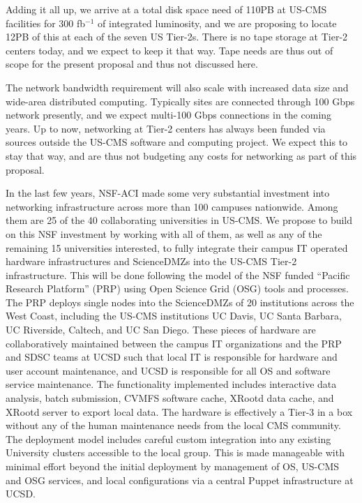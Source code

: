 \documentclass[11pt,a4paper]{article}
\begin{document}
Adding it all up, we arrive at a total disk space need of 110PB at US-CMS facilities for 300 fb$^{-1}$ of integrated luminosity, 
and we are proposing to locate 12PB of this at each of the seven US Tier-2s.
There is no tape storage at Tier-2 centers today, and we expect to keep it that way. Tape needs are thus out of scope for the present proposal
and thus not discussed here.


The network bandwidth requirement will also scale with increased data
size and wide-area distributed computing.  Typically sites are
connected through 100 Gbps network presently, and we expect
multi-100 Gbps connections in the coming years. Up to now, networking at Tier-2 centers has always been funded
via sources outside the US-CMS software and computing project. We expect this to stay that way, and are thus not budgeting
any costs for networking as part of this proposal.


In the last few years, NSF-ACI made some very substantial investment
into networking infrastructure across more than 100 campuses
nationwide. Among them are 25 of the 40 collaborating universities in
US-CMS. We propose to build on this NSF investment by working with all
of them, as well as any of the remaining 15 universities interested,
to fully integrate their campus IT operated hardware infrastructures
and ScienceDMZs into the US-CMS Tier-2 infrastructure. This will be
done following the model of the NSF funded ``Pacific Research
Platform'' (PRP) using Open Science Grid (OSG) tools and processes.
The PRP deploys single nodes into the ScienceDMZs of 20 institutions
across the West Coast, including the US-CMS institutions UC Davis, UC
Santa Barbara, UC Riverside, Caltech, and UC San Diego. These pieces
of hardware are collaboratively maintained between the campus IT
organizations and the PRP and SDSC teams at UCSD such that local IT is
responsible for hardware and user account maintenance, and UCSD is
responsible for all OS and software service maintenance.  The
functionality implemented includes interactive data analysis, batch
submission, CVMFS software cache, XRootd data cache, and XRootd server
to export local data. The hardware is effectively a Tier-3 in a box
without any of the human maintenance needs from the local CMS
community. The deployment model includes careful custom integration
into any existing University clusters accessible to the local
group. This is made manageable with minimal effort beyond the initial
deployment by management of OS, US-CMS and OSG services, and local
configurations via a central Puppet infrastructure at UCSD.
\end{document}
